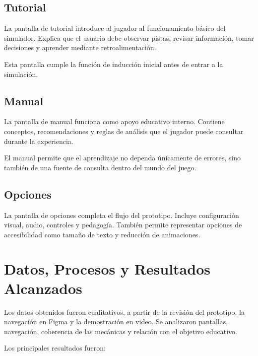 ﻿\documentclass[12pt]{article}
\begin{document}
\subsection{Tutorial}

La pantalla de tutorial introduce al jugador al funcionamiento b\'{a}sico del simulador. Explica que el usuario debe observar pistas, revisar informaci\'{o}n, tomar decisiones y aprender mediante retroalimentaci\'{o}n.

Esta pantalla cumple la funci\'{o}n de inducci\'{o}n inicial antes de entrar a la simulaci\'{o}n.

\subsection{Manual}

La pantalla de manual funciona como apoyo educativo interno. Contiene conceptos, recomendaciones y reglas de an\'{a}lisis que el jugador puede consultar durante la experiencia.

El manual permite que el aprendizaje no dependa \'{u}nicamente de errores, sino tambi\'{e}n de una fuente de consulta dentro del mundo del juego.

\subsection{Opciones}

La pantalla de opciones completa el flujo del prototipo. Incluye configuraci\'{o}n visual, audio, controles y pedagog\'{i}a. Tambi\'{e}n permite representar opciones de accesibilidad como tama\~{n}o de texto y reducci\'{o}n de animaciones.

\section{Datos, Procesos y Resultados Alcanzados}

Los datos obtenidos fueron cualitativos, a partir de la revisi\'{o}n del prototipo, la navegaci\'{o}n en Figma y la demostraci\'{o}n en video. Se analizaron pantallas, navegaci\'{o}n, coherencia de las mec\'{a}nicas y relaci\'{o}n con el objetivo educativo.

Los principales resultados fueron:
\end{document}
